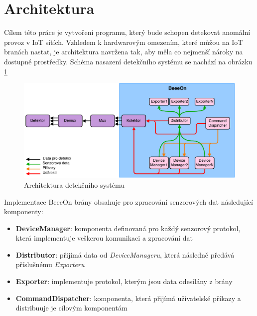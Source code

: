  \section{Architektura}
 Cílem této práce je vytvoření programu, který bude schopen detekovat anomální provoz v IoT sítích. 
 Vzhledem k hardwarovým omezením, které můžou na IoT branách nastat, je architektura navržena tak, aby
 měla co nejmenší nároky na dostupné prostředky. Schéma nasazení detekčního systému se nachází
 na obrázku \ref{obr.deploy-arch}
 
 \begin{figure}[ht]
   \begin{center}
   \includegraphics[scale=0.41]{pictures/deploy-arch}
   \caption{Architektura detekčního systému}
   \label{obr.deploy-arch}
   \end{center}
   \end{figure}
 
 Implementace BeeeOn brány obsahuje pro zpracování senzorových dat následující komponenty:
 \begin{itemize}
  \item \textbf{DeviceManager}:
    komponenta definovaná pro každý senzorový protokol, která implementuje veškerou komunikaci
    a zpracování dat
    
  \item \textbf{Distributor}:  
  přijímá data od \textit{DeviceManageru}, která následně předává příslušnému \textit{Exporteru}
  
  \item \textbf{Exporter}:
  implementuje protokol, kterým jsou data odesílány z brány
  
  \item \textbf{CommandDispatcher}:  
  komponenta, která přijímá uživatelské příkazy a distribuuje je cílovým komponentám
  
 \end{itemize}
 
